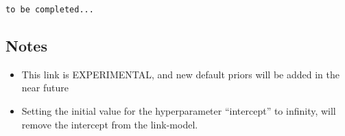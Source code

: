 \documentclass[a4paper,11pt]{article}
\begin{document}
\begin{verbatim}
to be completed...
\end{verbatim}

\subsection*{Notes}

\begin{itemize}
\item This link is EXPERIMENTAL, and new default priors will be added
    in the near future
\item Setting the initial value for the hyperparameter ``intercept''
    to infinity, will remove the intercept from the link-model.
\end{itemize}
\end{document}
